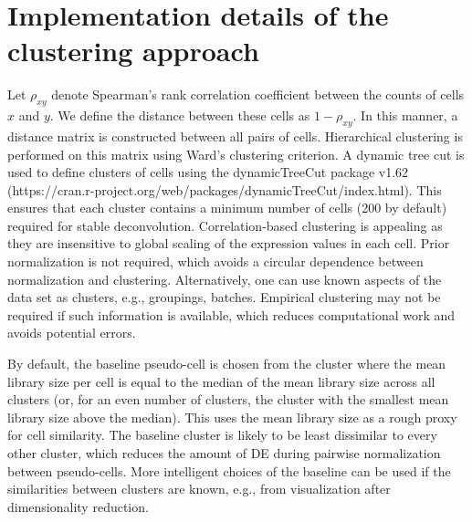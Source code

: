 \documentclass{article}
\begin{document}
\section{Implementation details of the clustering approach}
Let $\rho_{xy}$ denote Spearman's rank correlation coefficient between the counts of cells $x$ and $y$.
We define the distance between these cells as $1-\rho_{xy}$.
In this manner, a distance matrix is constructed between all pairs of cells.
Hierarchical clustering is performed on this matrix using Ward's clustering criterion.
A dynamic tree cut is used to define clusters of cells using the dynamicTreeCut package v1.62 ({https://cran.r-project.org/web/packages/dynamicTreeCut/index.html}).
This ensures that each cluster contains a minimum number of cells (200 by default) required for stable deconvolution.
Correlation-based clustering is appealing as they are insensitive to global scaling of the expression values in each cell.
Prior normalization is not required, which avoids a circular dependence between normalization and clustering.
Alternatively, one can use known aspects of the data set as clusters, e.g., groupings, batches.
Empirical clustering may not be required if such information is available, which reduces computational work and avoids potential errors.


By default, the baseline pseudo-cell is chosen from the cluster where the mean library size per cell is equal to the median of the mean library size across all clusters
    (or, for an even number of clusters, the cluster with the smallest mean library size above the median).
This uses the mean library size as a rough proxy for cell similarity.
The baseline cluster is likely to be least dissimilar to every other cluster, which reduces the amount of DE during pairwise normalization between pseudo-cells.
More intelligent choices of the baseline can be used if the similarities between clusters are known, e.g., from visualization after dimensionality reduction.
\end{document}
